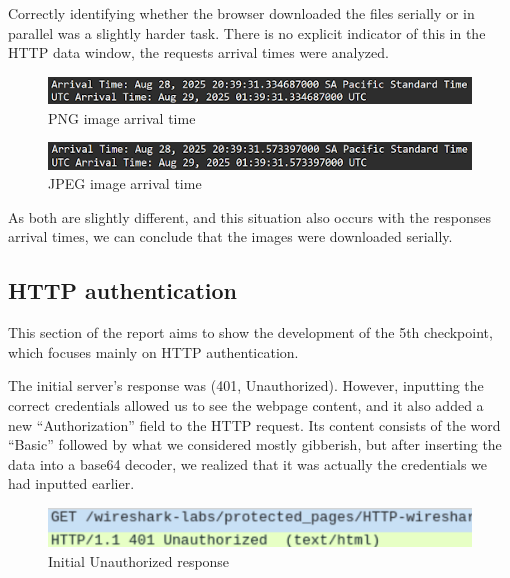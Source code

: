 Correctly identifying whether the browser downloaded the files serially or in
parallel was a slightly harder task. There is no explicit indicator of this in
the HTTP data window, the requests arrival times were analyzed.

\begin{figure}[htbp]
    \centering
    \includegraphics[width=1\linewidth]{img/15.png}
    \caption{PNG image arrival time}\label{fig:15}
\end{figure}

\begin{figure}[htbp]
    \centering
    \includegraphics[width=1\linewidth]{img/16.png}
    \caption{JPEG image arrival time}\label{fig:16}
\end{figure}

As both are slightly different, and this situation also occurs with the
responses arrival times, we can conclude that the images were downloaded
serially.

\subsection{HTTP authentication}
This section of the report aims to show the development of the 5th checkpoint,
which focuses mainly on HTTP authentication.

The initial server's response was (401, Unauthorized). However, inputting the
correct credentials allowed us to see the webpage content, and it also added a
new ``Authorization'' field to the HTTP request. Its content consists of the
word ``Basic'' followed by what we considered mostly gibberish, but after
inserting the data into a base64 decoder, we realized that it was actually the
credentials we had inputted earlier.

\begin{figure}[htbp]
    \centering
    \includegraphics[width=1\linewidth]{img/17.png}
    \caption{Initial Unauthorized response}\label{fig:17}
\end{figure}

